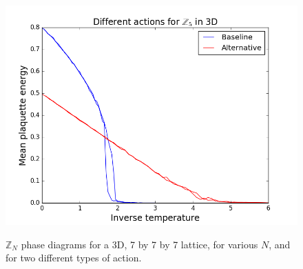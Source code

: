\documentclass[9pt,twocolumn,twoside]{article}
\begin{document}
\begin{figure}[p]
{		\includegraphics[width=.9\columnwidth]{z5actions,3d}
	}
	\caption{$\mathbb{Z}_N$ phase diagrams for a 3D, 7 by 7 by 7 lattice, for various $N$, and for two different types of action.}
	\label{znactions}
\end{figure}
\end{document}
